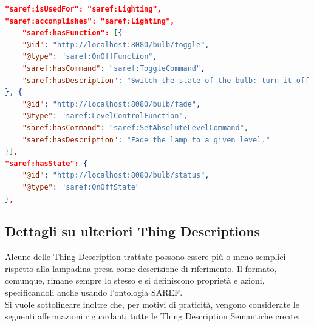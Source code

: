 \documentclass[12pt,a4paper,openright,oneside]{report}
\begin{document}
\begin{lstlisting}[language=json,caption={Aggiunta di semantica per la lampadina},label=lst:semantic-td2]
"saref:isUsedFor": "saref:Lighting",
"saref:accomplishes": "saref:Lighting",
	"saref:hasFunction": [{	
	"@id": "http://localhost:8080/bulb/toggle",
	"@type": "saref:OnOffFunction",
	"saref:hasCommand": "saref:ToggleCommand",
	"saref:hasDescription": "Switch the state of the bulb: turn it off if on or turn it on when off."
}, {
	"@id": "http://localhost:8080/bulb/fade",
	"@type": "saref:LevelControlFunction",
	"saref:hasCommand": "saref:SetAbsoluteLevelCommand",
	"saref:hasDescription": "Fade the lamp to a given level."
}],
"saref:hasState": {
	"@id": "http://localhost:8080/bulb/status",
	"@type": "saref:OnOffState"
},
\end{lstlisting}


\subsection{Dettagli su ulteriori Thing Descriptions}
Alcune delle Thing Description trattate possono essere più o meno semplici rispetto alla lampadina presa come descrizione di riferimento. Il formato, comunque, rimane sempre lo stesso e si definiscono proprietà e azioni, specificandoli anche usando l'ontologia SAREF.\\

Si vuole sottolineare inoltre che, per motivi di praticità, vengono considerate le seguenti affermazioni riguardanti tutte le Thing Description Semantiche create:
\end{document}
